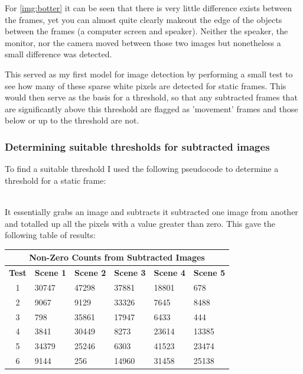 \documentclass[11pt]{article} %
\begin{document}
{{For \cref{img:botter} it can be seen that there is very little difference exists between the frames, yet you can almost quite clearly makeout the edge of the objects between the frames (a computer screen and speaker). Neither the speaker, the monitor, nor the camera moved between those two images but nonetheless a small difference was detected.

This served as my first model for image detection by performing a small test to see how many of these sparse white pixels are detected for static frames. This would then serve as the basis for a threshold, so that any subtracted frames that are significantly above this threshold are flagged as 'movement' frames and those below or up to the threshold 
are not.
\pagebreak

\subsubsection{Determining suitable thresholds for subtracted images}
To find a suitable threshold I used the following pseudocode to determine a threshold for a static frame:\\\\
\begin{frame}{}
	\vspace{-40pt}
	
\end{frame}
It essentially grabs an image and subtracts it subtracted one image from another and totalled up all the pixels with a value greater than zero. This gave the following table of results:
\begin{center}
\begin{table}[!htbp]
	\begin{center}
	\begin{tabular}{| c | l | l | l | l | l | }
\hline
\multicolumn{6}{|c|}{\bf Non-Zero Counts from Subtracted Images} \\
\hline
\bf Test	&\bf Scene 1	&\bf Scene 2	&\bf Scene 3	&\bf Scene 4	&\bf Scene 5	\\ \hline
1	&30747	&47298	&37881	&18801	&678\\
2	&9067	&9129	&33326	&7645	&8488\\
3	&798	&35861	&17947	&6433	&444\\
4	&3841	&30449	&8273	&23614	&13385\\
5	&34379	&25246	&6303	&41523	&23474\\
6	&9144	&256	&14960	&31458	&25138\\

\end{tabular}
\end{center}
\end{table}
\end{center}}}
\end{document}
